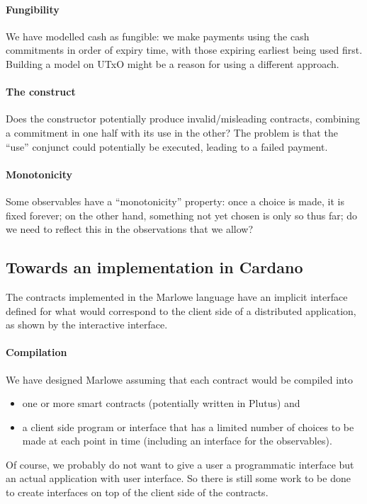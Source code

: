 \documentclass[
      acmsmall
    , screen
    , review=true
  ]{acmart}
\begin{document}
\paragraph{Fungibility}

We have modelled cash as fungible: we make payments using the cash commitments in order of expiry time, with those expiring earliest being used first. Building a model on UTxO might be a reason for using a different approach.


\paragraph{The  construct}

Does the  constructor potentially produce invalid/misleading contracts, combining a commitment in 
one half with its use in the other? The problem is that the ``use'' conjunct could potentially be executed, leading to 
a failed payment. 

\paragraph{Monotonicity}

Some observables have a ``monotonicity'' property: once a choice is made, it is fixed forever; on the other hand, something not yet chosen is only so thus far; do we need to reflect this in the observations that we allow?


\subsection{Towards an implementation in Cardano}
\label{section:towards-implementation}


The contracts implemented in the Marlowe language have an implicit interface defined for what would correspond to the client side of a distributed application, as shown by the interactive interface. 

\paragraph{Compilation}

We have designed Marlowe assuming that each contract would be compiled into
\begin{itemize} 
\item one or more smart contracts (potentially written in Plutus) and 
\item a client side program or interface that has a limited number of choices to be made at each point in time (including an interface for the observables). 
\end{itemize}
Of course, we probably do not want to give a user a programmatic interface but an actual application with user interface. So there is still some work to be done to create interfaces on top of the client side of the contracts.
\end{document}
